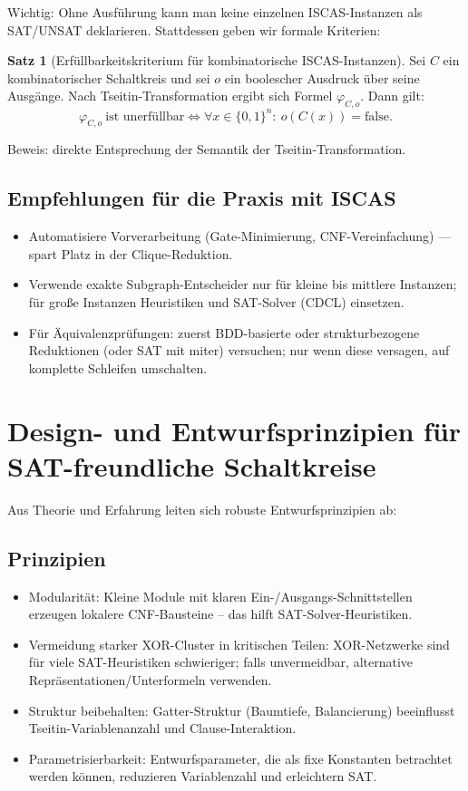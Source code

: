 \documentclass[a4paper,12pt]{article}
\theoremstyle{definition}
\newtheorem{satz}{Satz}[section]
\begin{document}
Wichtig: Ohne Ausführung kann man keine einzelnen ISCAS-Instanzen als SAT/UNSAT deklarieren. Stattdessen geben wir formale Kriterien:
\begin{satz}[Erfüllbarkeitskriterium für kombinatorische ISCAS-Instanzen]
Sei $C$ ein kombinatorischer Schaltkreis und sei $o$ ein boolescher Ausdruck über seine Ausgänge. Nach Tseitin-Transformation ergibt sich Formel $\varphi_{C,o}$. Dann gilt:
\[
\varphi_{C,o}\ \text{ist unerfüllbar} \iff \forall x\in\{0,1\}^{n}:\ o(C(x))=\text{false}.
\]
\end{satz}
Beweis: direkte Entsprechung der Semantik der Tseitin-Transformation.

\subsection{Empfehlungen für die Praxis mit ISCAS}
\begin{itemize}
  \item Automatisiere Vorverarbeitung (Gate-Minimierung, CNF-Vereinfachung) — spart Platz in der Clique-Reduktion.
  \item Verwende exakte Subgraph-Entscheider nur für kleine bis mittlere Instanzen; für große Instanzen Heuristiken und SAT-Solver (CDCL) einsetzen.
  \item Für Äquivalenzprüfungen: zuerst BDD-basierte oder strukturbezogene Reduktionen (oder SAT mit miter) versuchen; nur wenn diese versagen, auf komplette Schleifen umschalten.
\end{itemize}

\section{Design- und Entwurfsprinzipien für SAT-freundliche Schaltkreise}
\label{ch:design}

Aus Theorie und Erfahrung leiten sich robuste Entwurfsprinzipien ab:

\subsection{Prinzipien}
\begin{itemize}
  \item Modularität: Kleine Module mit klaren Ein-/Ausgangs-Schnittstellen erzeugen lokalere CNF-Bausteine – das hilft SAT-Solver-Heuristiken.
  \item Vermeidung starker XOR-Cluster in kritischen Teilen: XOR-Netzwerke sind für viele SAT-Heuristiken schwieriger; falls unvermeidbar, alternative Repräsentationen/Unterformeln verwenden.
  \item Struktur beibehalten: Gatter-Struktur (Baumtiefe, Balancierung) beeinflusst Tseitin-Variablenanzahl und Clause-Interaktion.
  \item Parametrisierbarkeit: Entwurfsparameter, die als fixe Konstanten betrachtet werden können, reduzieren Variablenzahl und erleichtern SAT.
\end{itemize}
\end{document}
